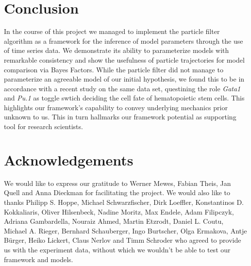 \documentclass{bioinfo}
\begin{document}

\section{Conclusion}

In the course of this project we managed to implement the particle filter algorithm as a framework for the inference of model parameters through the use of time series data. We demonstrate its ability to parameterize models with remarkable consistency and show the usefulness of particle trajectories for model comparison via Bayes Factors. While the particle filter did not manage to parameterize an agreeable model of our initial hypothesis, we found this to be in accordance with a recent study on the same data set, questining the role \textit{Gata1} and \textit{Pu.1} as toggle swtich deciding the cell fate of hematopoietic stem cells. This highlights our framework's capability to convey underlying mechanics prior unknown to us. This in turn hallmarks our framework potential as supporting tool for research scientists.

\vspace*{-6pt}




\section*{Acknowledgements}

We would like to express our gratitude to Werner Mewes, Fabian Theis, Jan Quell and Anna Dieckman for facilitating the project. We would also like to thanks Philipp S. Hoppe, Michael Schwarzfischer, Dirk Loeffler, Konstantinos D. Kokkaliaris, Oliver Hilsenbeck, Nadine Moritz, Max Endele, Adam Filipczyk, Adriana Gambardella, Nouraiz Ahmed, Martin Etzrodt, Daniel L. Coutu, Michael A. Rieger, Bernhard Schauberger, Ingo Burtscher, Olga Ermakova, Antje B\"urger, Heiko Lickert, Claus Nerlov and Timm Schroder who agreed to provide us with the experiment data, without which we wouldn't be able to test our framework and models. 
\end{document}
